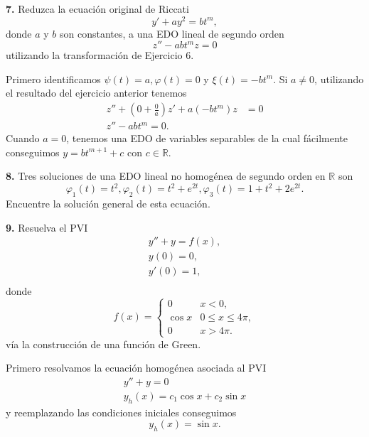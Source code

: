 \documentclass{article}
\newenvironment{statement}[1]{\smallskip\noindent\color[rgb]{1.00,0.00,0.50} {\bf #1.}}{}
\theoremstyle{definition}
\theoremstyle{remark}
\newcommand{\BR}{\mathbb R}
\begin{document}
\begin{statement}{7}
  Reduzca la ecuaci\'on original de Riccati
  \[
    y' + a y^2 = b t^m,  
  \]
  donde $a$ y $b$ son constantes, a una EDO lineal de segundo orden
  \[
    z'' - a b t^m z = 0  
  \]
  utilizando la transformaci\'on de Ejercicio 6.
\end{statement}

\bigskip

Primero identificamos $\psi(t) = a, \varphi(t) = 0$ y $\xi(t) = -b t^m$.
Si $a \neq 0$, utilizando el resultado del ejercicio anterior tenemos
\begin{align*}
  z'' + \left(0 + \frac{0}{a}\right)  z' + a (-b t^m) z &= 0\\
  z'' - a b t^m = 0.
\end{align*}
Cuando $a = 0$, tenemos una EDO de variables separables de la cual f\'acilmente
conseguimos $y = b t^{m + 1} + c$ con $c \in \BR$.

\bigskip

\begin{statement}{8}
  Tres soluciones de una EDO lineal no homog\'enea de segundo orden en $\BR$ son
  \[
    \varphi_1(t) = t^2,
    \varphi_2(t) = t^2 + e^{2t},
    \varphi_3(t) = 1 + t^2 + 2e^{2t}.  
  \]
  Encuentre la soluci\'on general de esta ecuaci\'on.
\end{statement}

\begin{statement}{9}
  Resuelva el PVI
  \begin{gather*}
    y'' + y = f(x),\\
    y(0) = 0,\\
    y'(0) = 1,\\
  \end{gather*}
  donde
  \[
    f(x) =
    \begin{cases}
      0 & x < 0,\\
      \cos x & 0 \leq x \leq 4 \pi,\\
      0 & x > 4 \pi.
    \end{cases}  
  \]
  v\'ia la construcci\'on de una funci\'on de Green.
\end{statement}

\bigskip

Primero resolvamos la ecuaci\'on homog\'enea asociada al PVI
\begin{gather*}
  y'' + y = 0\\
  y_h(x) = c_1 \cos x + c_2 \sin x
\end{gather*}
y reemplazando las condiciones iniciales conseguimos
\[
  y_h(x) = \sin x.  
\]
\end{document}
